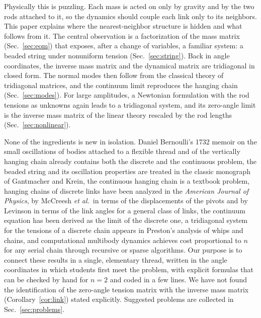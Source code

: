 \documentclass[11pt]{article}
\begin{document}
Physically this is puzzling. Each mass is acted on only by gravity and by the two rods attached to it, so the dynamics should couple each link only to its neighbors. This paper explains where the nearest-neighbor structure is hidden and what follows from it. The central observation is a factorization of the mass matrix (Sec.~\ref{sec:eom}) that exposes, after a change of variables, a familiar system: a beaded string under nonuniform tension (Sec.~\ref{sec:string}). Back in angle coordinates, the inverse mass matrix and the dynamical matrix are tridiagonal in closed form. The normal modes then follow from the classical theory of tridiagonal matrices, and the continuum limit reproduces the hanging chain (Sec.~\ref{sec:modes}). For large amplitudes, a Newtonian formulation with the rod tensions as unknowns again leads to a tridiagonal system, and its zero-angle limit is the inverse mass matrix of the linear theory rescaled by the rod lengths (Sec.~\ref{sec:nonlinear}).

None of the ingredients is new in isolation. Daniel Bernoulli's 1732 memoir on the small oscillations of bodies attached to a flexible thread and of the vertically hanging chain already contains both the discrete and the continuous problem,\cite{bernoulli1732theoremata} the beaded string and its oscillation properties are treated in the classic monograph of Gantmacher and Krein,\cite{gantmacher2002oscillation} the continuous hanging chain is a textbook problem,\cite{verbin2015boundary} hanging chains of discrete links have been analyzed in the \emph{American Journal of Physics}, by McCreesh \emph{et al.}\ in terms of the displacements of the pivots and by Levinson in terms of the link angles for a general class of links,\cite{mccreesh1975vibrations,levinson1977natural} the continuum equation has been derived as the limit of the discrete one,\cite{weng1994transverse,lee2003analytically} a tridiagonal system for the tensions of a discrete chain appears in Preston's analysis of whips and chains,\cite{preston2011motion} and computational multibody dynamics achieves cost proportional to $n$ for any serial chain through recursive or sparse algorithms.\cite{featherstone2008rigid,jain2011robot,baraff1996linear,bailey2008efficient} Our purpose is to connect these results in a single, elementary thread, written in the angle coordinates in which students first meet the problem, with explicit formulas that can be checked by hand for $n=2$ and coded in a few lines. We have not found the identification of the zero-angle tension matrix with the inverse mass matrix (Corollary~\ref{cor:link}) stated explicitly. Suggested problems are collected in Sec.~\ref{sec:problems}.
\end{document}

